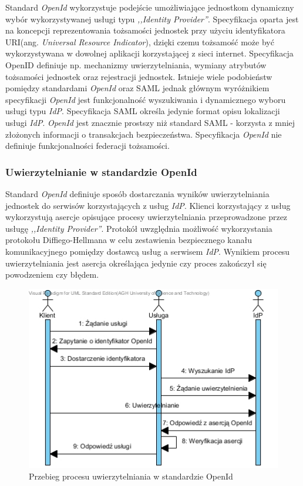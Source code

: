 	Standard \textit{OpenId} wykorzystuje podejście umożliwiające jednostkom dynamiczny wybór wykorzystywanej usługi typu \textit{,,Identity Provider''}. Specyfikacja oparta jest na koncepcji reprezentowania tożsamości jednostek przy użyciu identyfikatora URI(ang. \textit{Universal Resource Indicator}), dzięki czemu tożsamość może być wykorzystywana w dowolnej aplikacji korzystającej z sieci internet. Specyfikacja OpenID definiuje np. mechanizmy uwierzytelniania, wymiany atrybutów tożsamości jednostek oraz rejestracji jednostek. Istnieje wiele podobieństw pomiędzy standardami \textit{OpenId} oraz SAML jednak głównym wyróżnikiem specyfikacji \textit{OpenId} jest funkcjonalność wyszukiwania i dynamicznego wyboru usługi typu \textit{IdP}. Specyfikacja SAML określa jedynie format opisu lokalizacji usługi \textit{IdP}. \textit{OpenId} jest znacznie prostszy niż standard SAML - korzysta z mniej złożonych informacji o transakcjach bezpieczeństwa. Specyfikacja \textit{OpenId} nie definiuje funkcjonalności federacji tożsamości\cite{Bertino11}.

	\subsubsection{Uwierzytelnianie w standardzie OpenId}

		Standard \textit{OpenId} definiuje sposób dostarczania wyników uwierzytelniania jednostek do serwisów korzystających z usług \textit{IdP}. Klienci korzystający z usług wykorzystują asercje opisujące procesy uwierzytelniania przeprowadzone przez usługę \textit{,,Identity Provider''}. Protokół uwzględnia możliwość wykorzystania protokołu Diffiego-Hellmana w celu zestawienia bezpiecznego kanału komunikacyjnego pomiędzy dostawcą usług a serwisem \textit{IdP}. Wynikiem procesu uwierzytelniania jest asercja określająca jedynie czy proces zakończył się powodzeniem czy błędem. 

		\begin{figure}[h]
			\centering
			\includegraphics{img/OpenIdAuthentication.jpg}
			\caption{Przebieg procesu uwierzytelniania w standardzie OpenId}
			\label{OpenIdAuthentication}
		\end{figure}

